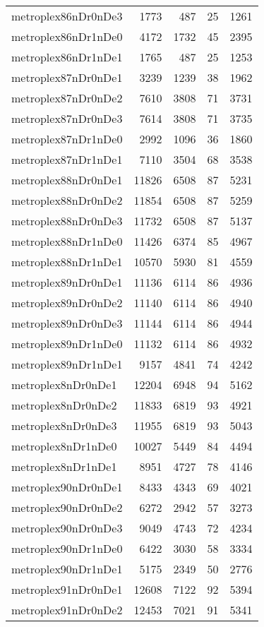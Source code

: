 \documentclass[../../../thesis.tex]{subfiles}
\begin{document}
\begin{longtable}{lrrrr}
metroplex86nDr0nDe3 & 1773 & 487 & 25 & 1261 \\
metroplex86nDr1nDe0 & 4172 & 1732 & 45 & 2395 \\
metroplex86nDr1nDe1 & 1765 & 487 & 25 & 1253 \\
metroplex87nDr0nDe1 & 3239 & 1239 & 38 & 1962 \\
metroplex87nDr0nDe2 & 7610 & 3808 & 71 & 3731 \\
metroplex87nDr0nDe3 & 7614 & 3808 & 71 & 3735 \\
metroplex87nDr1nDe0 & 2992 & 1096 & 36 & 1860 \\
metroplex87nDr1nDe1 & 7110 & 3504 & 68 & 3538 \\
metroplex88nDr0nDe1 & 11826 & 6508 & 87 & 5231 \\
metroplex88nDr0nDe2 & 11854 & 6508 & 87 & 5259 \\
metroplex88nDr0nDe3 & 11732 & 6508 & 87 & 5137 \\
metroplex88nDr1nDe0 & 11426 & 6374 & 85 & 4967 \\
metroplex88nDr1nDe1 & 10570 & 5930 & 81 & 4559 \\
metroplex89nDr0nDe1 & 11136 & 6114 & 86 & 4936 \\
metroplex89nDr0nDe2 & 11140 & 6114 & 86 & 4940 \\
metroplex89nDr0nDe3 & 11144 & 6114 & 86 & 4944 \\
metroplex89nDr1nDe0 & 11132 & 6114 & 86 & 4932 \\
metroplex89nDr1nDe1 & 9157 & 4841 & 74 & 4242 \\
metroplex8nDr0nDe1 & 12204 & 6948 & 94 & 5162 \\
metroplex8nDr0nDe2 & 11833 & 6819 & 93 & 4921 \\
metroplex8nDr0nDe3 & 11955 & 6819 & 93 & 5043 \\
metroplex8nDr1nDe0 & 10027 & 5449 & 84 & 4494 \\
metroplex8nDr1nDe1 & 8951 & 4727 & 78 & 4146 \\
metroplex90nDr0nDe1 & 8433 & 4343 & 69 & 4021 \\
metroplex90nDr0nDe2 & 6272 & 2942 & 57 & 3273 \\
metroplex90nDr0nDe3 & 9049 & 4743 & 72 & 4234 \\
metroplex90nDr1nDe0 & 6422 & 3030 & 58 & 3334 \\
metroplex90nDr1nDe1 & 5175 & 2349 & 50 & 2776 \\
metroplex91nDr0nDe1 & 12608 & 7122 & 92 & 5394 \\
metroplex91nDr0nDe2 & 12453 & 7021 & 91 & 5341 \\

\end{longtable}
\end{document}
